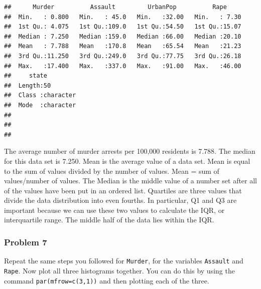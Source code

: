 \documentclass[
]{article}
\newenvironment{Shaded}{\begin{snugshade}}{\end{snugshade}}
\newcommand{\AttributeTok}[1]{\textcolor[rgb]{0.77,0.63,0.00}{#1}}
\newcommand{\DecValTok}[1]{\textcolor[rgb]{0.00,0.00,0.81}{#1}}
\newcommand{\FunctionTok}[1]{\textcolor[rgb]{0.00,0.00,0.00}{#1}}
\newcommand{\NormalTok}[1]{#1}
\newcommand{\SpecialCharTok}[1]{\textcolor[rgb]{0.00,0.00,0.00}{#1}}
\newcommand{\StringTok}[1]{\textcolor[rgb]{0.31,0.60,0.02}{#1}}
\begin{document}
\begin{verbatim}
##      Murder          Assault         UrbanPop          Rape      
##  Min.   : 0.800   Min.   : 45.0   Min.   :32.00   Min.   : 7.30  
##  1st Qu.: 4.075   1st Qu.:109.0   1st Qu.:54.50   1st Qu.:15.07  
##  Median : 7.250   Median :159.0   Median :66.00   Median :20.10  
##  Mean   : 7.788   Mean   :170.8   Mean   :65.54   Mean   :21.23  
##  3rd Qu.:11.250   3rd Qu.:249.0   3rd Qu.:77.75   3rd Qu.:26.18  
##  Max.   :17.400   Max.   :337.0   Max.   :91.00   Max.   :46.00  
##     state          
##  Length:50         
##  Class :character  
##  Mode  :character  
##                    
##                    
## 
\end{verbatim}

The average number of murder arrests per 100,000 residents is 7.788. The
median for this data set is 7.250. Mean is the average value of a data
set. Mean is equal to the sum of values divided by the number of values.
Mean = sum of values/number of values. The Median is the middle value of
a number set after all of the values have been put in an ordered list.
Quartiles are three values that divide the data distribution into even
fourths. In particular, Q1 and Q3 are important because we can use these
two values to calculate the IQR, or interquartile range. The middle half
of the data lies within the IQR.

\hypertarget{problem-7}{%
\subsubsection{Problem 7}\label{problem-7}}

Repeat the same steps you followed for \texttt{Murder}, for the
variables \texttt{Assault} and \texttt{Rape}. Now plot all three
histograms together. You can do this by using the command
\texttt{par(mfrow=c(3,1))} and then plotting each of the three.

\begin{Shaded}
\end{Shaded}
\end{document}
